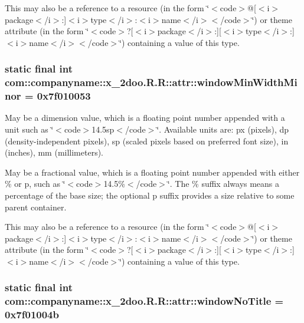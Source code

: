 This may also be a reference to a resource (in the form \char`\"{}$<$code$>$@\mbox{[}$<$i$>$package$<$/i$>$:\mbox{]}$<$i$>$type$<$/i$>$:$<$i$>$name$<$/i$>$$<$/code$>$\char`\"{}) or theme attribute (in the form \char`\"{}$<$code$>$?\mbox{[}$<$i$>$package$<$/i$>$:\mbox{]}\mbox{[}$<$i$>$type$<$/i$>$:\mbox{]}$<$i$>$name$<$/i$>$$<$/code$>$\char`\"{}) containing a value of this type. \hypertarget{classcom_1_1companyname_1_1x__2doo_1_1_r_1_1attr_c079db34365f9882cedca130639fb4a4}{
\subsubsection[{windowMinWidthMinor}]{\setlength{\rightskip}{0pt plus 5cm}static final int com::companyname::x\_\-2doo.R.R::attr::windowMinWidthMinor = 0x7f010053}}
\label{classcom_1_1companyname_1_1x__2doo_1_1_r_1_1attr_c079db34365f9882cedca130639fb4a4}


May be a dimension value, which is a floating point number appended with a unit such as \char`\"{}$<$code$>$14.5sp$<$/code$>$\char`\"{}. Available units are: px (pixels), dp (density-independent pixels), sp (scaled pixels based on preferred font size), in (inches), mm (millimeters). 

May be a fractional value, which is a floating point number appended with either \% or p, such as \char`\"{}$<$code$>$14.5\%$<$/code$>$\char`\"{}. The \% suffix always means a percentage of the base size; the optional p suffix provides a size relative to some parent container. 

This may also be a reference to a resource (in the form \char`\"{}$<$code$>$@\mbox{[}$<$i$>$package$<$/i$>$:\mbox{]}$<$i$>$type$<$/i$>$:$<$i$>$name$<$/i$>$$<$/code$>$\char`\"{}) or theme attribute (in the form \char`\"{}$<$code$>$?\mbox{[}$<$i$>$package$<$/i$>$:\mbox{]}\mbox{[}$<$i$>$type$<$/i$>$:\mbox{]}$<$i$>$name$<$/i$>$$<$/code$>$\char`\"{}) containing a value of this type. \hypertarget{classcom_1_1companyname_1_1x__2doo_1_1_r_1_1attr_bbdf5a40d5bc7d26b3742026ca6ce14c}{
\subsubsection[{windowNoTitle}]{\setlength{\rightskip}{0pt plus 5cm}static final int com::companyname::x\_\-2doo.R.R::attr::windowNoTitle = 0x7f01004b}}
\label{classcom_1_1companyname_1_1x__2doo_1_1_r_1_1attr_bbdf5a40d5bc7d26b3742026ca6ce14c}


